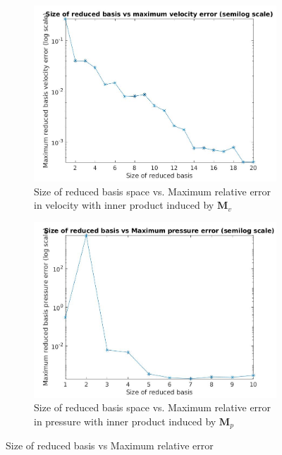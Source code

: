 \documentclass[graybox]{svmult}
\begin{document}
\begin{figure}
\begin{subfigure}{0.48\textwidth}
\includegraphics[width=\linewidth]{size_vs_maximum_reduced_basis_velocity_error_semilog.jpg}
\caption{Size of reduced basis space vs. Maximum relative error in velocity with inner product induced by $\bm{M}_v$} \label{error_vs_basis_velocity}
\end{subfigure}\hspace*{\fill}
\begin{subfigure}{0.48\textwidth}
\includegraphics[width=\linewidth]{size_vs_maximum_reduced_basis_pressure_error_semilog.jpg}
\caption{Size of reduced basis space vs. Maximum relative error in pressure with inner product induced by $\bm{M}_p$} \label{error_vs_basis_pressure}
\end{subfigure}
  \caption{Size of reduced basis vs Maximum relative error} 
\label{error_vs_basis}
\end{figure}
\end{document}
